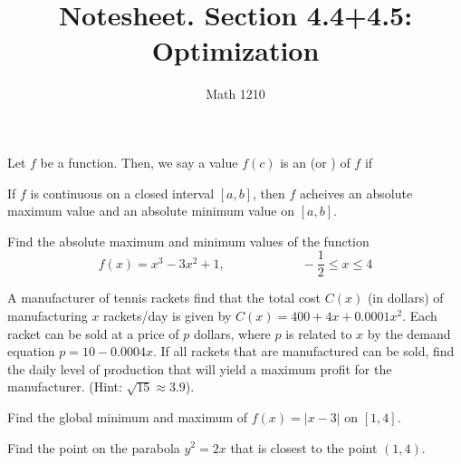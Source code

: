 \documentclass[12pt, a4paper]{article}
\author{Math 1210}
\title{Notesheet. Section 4.4+4.5: Optimization}
\date{}
\begin{document}
\maketitle
\nameline
\begin{defi}
  Let \(f\) be a function. Then, we say a value \(f(c)\) is an
   (or ) of \(f\) if
\end{defi}
\begin{thrm}
  If \(f\) is continuous on a closed interval \([a,b]\), then \(f\)
  acheives an absolute maximum value and an absolute minimum value on
  \([a,b]\).
\end{thrm}
\vspace{-1in}
\begin{ex}
  Find the absolute maximum and minimum values of the function \[
    f(x) = x^3 - 3x^2 + 1, \hspace{1in} -\frac{1}{2} \leq x \leq 4
  \]
\end{ex}
\vspace{-0.75in}
\begin{ex}
  A manufacturer of tennis rackets find that the total cost \(C(x)\)
  (in dollars) of manufacturing \(x\) rackets/day is given by \(C(x) =
  400 + 4x + 0.0001x^2\). Each racket can be sold at a price of \(p\)
  dollars, where \(p\) is related to \(x\) by the demand equation \(p
  = 10 - 0.0004x\). If all rackets that are manufactured can be sold,
  find the daily level of production that will yield a maximum profit
  for the manufacturer. (Hint: \(\sqrt{15} \approx 3.9\)).
\end{ex}
\begin{ex}
  Find the global minimum and maximum of \(f(x) = |x-3|\) on
  \([1,4]\).
\end{ex}
\begin{ex}
  Find the point on the parabola \(y^2 = 2x\) that is closest to the
  point \((1,4)\).
\end{ex}
\end{document}
